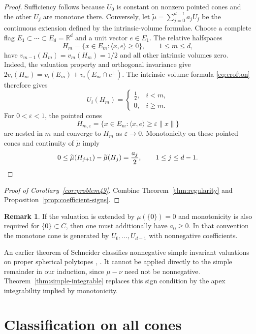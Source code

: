 \documentclass[11pt]{article}
\newcommand{\R}{\mathbb{R}}
\newcommand{\vct}[1]{#1}
\newcommand{\zero}{\vct{0}}
\newcommand{\eps}{\varepsilon}
\theoremstyle{plain}
\theoremstyle{definition}
\newtheorem{remark}[theorem]{Remark}
\begin{document}
\begin{proof}
Sufficiency follows because $U_0$ is constant on nonzero pointed
cones and the other $U_j$ are monotone there.
Conversely, let $\widetilde\mu=\sum_{j=0}^{d-1}a_jU_j$ be the
continuous extension defined by the intrinsic-volume formulae.
Choose a complete flag $E_1\subset\cdots\subset E_d=\R^d$ and a unit
vector $e\in E_1$.  The relative halfspaces
\[
  H_m=\{x\in E_m:\langle x,e\rangle\ge0\},\qquad 1\le m\le d,
\]
have $v_{m-1}(H_m)=v_m(H_m)=1/2$ and all other intrinsic volumes zero.
Indeed, the valuation property and orthogonal invariance give
$2v_i(H_m)=v_i(E_m)+v_i(E_m\cap e^\perp)$.
The intrinsic-volume formula \eqref{eq:crofton} therefore gives
\[
  U_i(H_m)=
  \begin{cases}\tfrac12,&i<m,\\0,&i\ge m.\end{cases}
\]
For $0<\eps<1$, the pointed cones
\[
  H_{m,\eps}=\{x\in E_m:\langle x,e\rangle\ge\eps\|x\|\}
\]
are nested in $m$ and converge to $H_m$ as $\eps\rightarrow 0$.
Monotonicity on these pointed cones and continuity of
$\widetilde\mu$ imply
\[
  0\le\widetilde\mu(H_{j+1})-\widetilde\mu(H_j)
    =\frac{a_j}{2},\qquad 1\le j\le d-1.\qedhere
\]
\end{proof}

\begin{proof}[Proof of Corollary~\ref{cor:problem49}]
Combine Theorem~\ref{thm:regularity} and
Proposition~\ref{prop:coefficient-signs}.
\end{proof}

\begin{remark}\label{rem:zero-monotonicity}
If the valuation is extended by $\mu(\{\zero\})=0$ and monotonicity
is also required for $\{\zero\}\subset C$, then one must additionally
have $a_0\ge0$.  In that convention the monotone cone is generated by
$U_0,\ldots,U_{d-1}$ with nonnegative coefficients.
\end{remark}

An earlier theorem of Schneider classifies nonnegative simple invariant
valuations on proper spherical polytopes
\cite[Theorem~6.2]{Sch78:Curvature-Measures},
\cite[Theorem~3.3.2]{Sch22:Convex-Cones}.
It cannot be applied directly to the simple remainder in our induction,
since $\mu-\nu$ need not be nonnegative.
Theorem~\ref{thm:simple-integrable} replaces this sign condition by
the apex integrability implied by monotonicity.

\section{Classification on all cones}\label{sec:all-cones}
\end{document}

